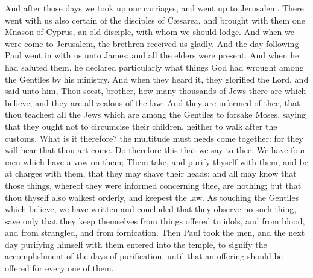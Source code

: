  And after those days we took up our carriages, and went up
to Jerusalem.  There went with us also certain of the
disciples of Cæsarea, and brought with them one Mnason of Cyprus, an old
disciple, with whom we should lodge.  And when we were come
to Jerusalem, the brethren received us gladly.  And the day
following Paul went in with us unto James; and all the elders were
present.  And when he had saluted them, he declared
particularly what things God had wrought among the Gentiles by his
ministry.  And when they heard it, they glorified the Lord,
and said unto him, Thou seest, brother, how many thousands of Jews there
are which believe; and they are all zealous of the law: 
And they are informed of thee, that thou teachest all the Jews which are
among the Gentiles to forsake Moses, saying that they ought not to
circumcise their children, neither to walk after the customs.
 What is it therefore? the multitude must needs come
together: for they will hear that thou art come.  Do
therefore this that we say to thee: We have four men which have a vow on
them;  Them take, and purify thyself with them, and be at
charges with them, that they may shave their heads: and all may know
that those things, whereof they were informed concerning thee, are
nothing; but that thou thyself also walkest orderly, and keepest the
law.  As touching the Gentiles which believe, we have
written and concluded that they observe no such thing, save only that
they keep themselves from things offered to idols, and from blood, and
from strangled, and from fornication.  Then Paul took the
men, and the next day purifying himself with them entered into the
temple, to signify the accomplishment of the days of purification, until
that an offering should be offered for every one of them.

